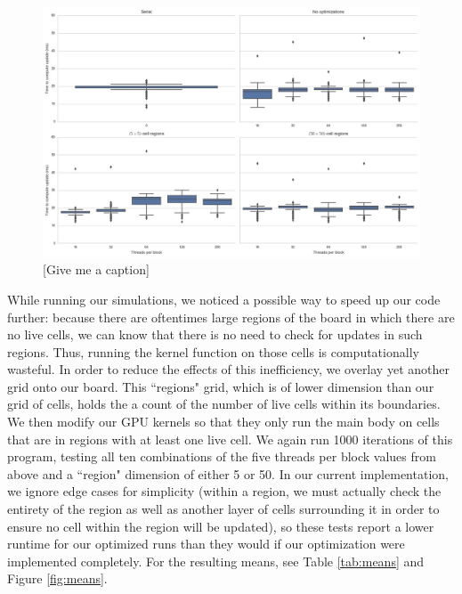 \documentclass[12pt]{article}
\begin{document}
    \begin{figure}[t]
        \centering
        \includegraphics[width=\textwidth]{../images/boxplot.jpg}
        \caption{[Give me a caption]}
        \label{fig:boxplots}
    \end{figure}

    While running our simulations, we noticed a possible way to speed up our code further: because there are oftentimes large regions of the board in which there are no live cells, we can know that there is no need to check for updates in such regions. Thus, running the kernel function on those cells is computationally wasteful. In order to reduce the effects of this inefficiency, we overlay yet another grid onto our board. This ``regions" grid, which is of lower dimension than our grid of cells, holds the a count of the number of live cells within its boundaries. We then modify our GPU kernels so that they only run the main body on cells that are in regions with at least one live cell. We again run 1000 iterations of this program, testing all ten combinations of the five threads per block values from above and a ``region" dimension of either 5 or 50. In our current implementation, we ignore edge cases for simplicity (within a region, we must actually check the entirety of the region as well as another layer of cells surrounding it in order to ensure no cell within the region will be updated), so these tests report a lower runtime for our optimized runs than they would if our optimization were implemented completely. For the resulting means, see Table \ref{tab:means} and Figure \ref{fig:means}.
    
\end{document}
